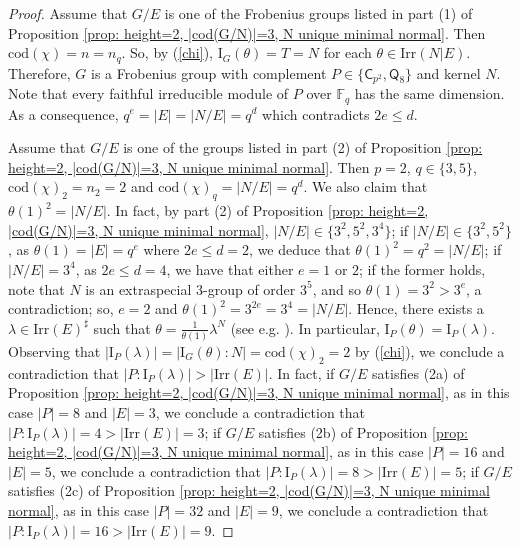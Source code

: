 \documentclass[9pt]{article}
\begin{document}
\begin{proof}
	 Assume that $G/E$ is one of the Frobenius groups listed in part (1) of Proposition \ref{prop: height=2, |cod(G/N)|=3, N unique minimal normal}.
	 Then $\mathrm{cod}(\chi)=n=n_q$.
	 So, by (\ref{chi}),
	 $\mathrm{I}_{G}(\theta)=T=N$ for each $\theta\in \mathrm{Irr}(N|E)$.
	 Therefore, $G$ is a Frobenius group with complement $P\in \{ \mathsf{C}_{p^{2}},\mathsf{Q}_8 \}$ and kernel $N$.
	 Note that every faithful irreducible module of $P$ over $\mathbb{F}_q$ has the same dimension.
	 As a consequence, $q^{e}=|E|=|N/E|=q^{d}$ which contradicts $2e\leq d$.
   
    Assume that $G/E$ is one of the groups listed in part (2) of Proposition \ref{prop: height=2, |cod(G/N)|=3, N unique minimal normal}.
	Then $p=2$, $q\in \{ 3,5 \}$, $\mathrm{cod}(\chi)_2=n_2=2$ and $\mathrm{cod}(\chi)_q=|N/E|=q^{d}$. 
	We also claim that $\theta(1)^{2}=|N/E|$.
    In fact, by part (2) of Proposition \ref{prop: height=2, |cod(G/N)|=3, N unique minimal normal},
	$|N/E|\in \{ 3^{2}, 5^{2}, 3^{4} \}$;
    if $|N/E|\in \{ 3^{2},5^{2} \}$, as $\theta(1)=|E|=q^{e}$ where $2e\leq d=2$,
	we deduce that $\theta(1)^{2}=q^{2}=|N/E|$;
	if $|N/E|=3^{4}$, as $2e\leq d=4$, we have that either $e=1$ or $2$;
	if the former holds, note that $N$ is an extraspecial $3$-group of order $3^{5}$,
	and so $\theta(1)=3^{2}>3^e$, a contradiction;
	so, $e=2$ and $\theta(1)^{2}=3^{2e}=3^{4}=|N/E|$.
    Hence, there exists a $\lambda\in \mathrm{Irr}(E)^\sharp$
	such that $\theta=\frac{1}{\theta(1)}\lambda^{N}$ (see e.g. \cite[Problem 6.3]{isaacs1994}).
    In particular, $\mathrm{I}_{P}(\theta)=\mathrm{I}_{P}(\lambda)$.
    Observing that  
	$|\mathrm{I}_{P}(\lambda)|=|\mathrm{I}_{G}(\theta):N|=\mathrm{cod}(\chi)_2=2$ by (\ref{chi}),
    we conclude a contradiction that $|P:\mathrm{I}_{P}(\lambda)|>|\mathrm{Irr}(E)|$.
    In fact, if $G/E$ satisfies (2a) of Proposition \ref{prop: height=2, |cod(G/N)|=3, N unique minimal normal}, as in this case $|P|=8$ and $|E|=3$,
	we conclude a contradiction that $|P:\mathrm{I}_{P}(\lambda)|=4>|\mathrm{Irr}(E)|=3$;
	if $G/E$ satisfies (2b) of Proposition \ref{prop: height=2, |cod(G/N)|=3, N unique minimal normal}, as in this case $|P|=16$ and $|E|=5$,
	we conclude a contradiction that $|P:\mathrm{I}_{P}(\lambda)|=8>|\mathrm{Irr}(E)|=5$;
	if $G/E$ satisfies (2c) of Proposition \ref{prop: height=2, |cod(G/N)|=3, N unique minimal normal}, as in this case $|P|=32$ and $|E|=9$,
	we conclude a contradiction that $|P:\mathrm{I}_{P}(\lambda)|=16>|\mathrm{Irr}(E)|=9$.
\end{proof}
\end{document}
